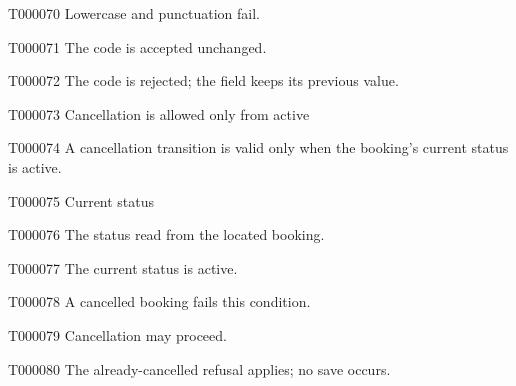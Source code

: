 \documentclass[11pt,a4paper]{article}
\begin{document}
\begin{atlasparagraph}{T000070}
Lowercase and punctuation fail.
\end{atlasparagraph}
\begin{atlasparagraph}{T000071}
The code is accepted unchanged.
\end{atlasparagraph}
\begin{atlasparagraph}{T000072}
The code is rejected; the field keeps its previous value.
\end{atlasparagraph}
\begin{atlastext}{T000073}
Cancellation is allowed only from active
\end{atlastext}
\begin{atlasparagraph}{T000074}
A cancellation transition is valid only when the booking's current status is active.
\end{atlasparagraph}
\begin{atlastext}{T000075}
Current status
\end{atlastext}
\begin{atlasparagraph}{T000076}
The status read from the located booking.
\end{atlasparagraph}
\begin{atlastext}{T000077}
The current status is active.
\end{atlastext}
\begin{atlasparagraph}{T000078}
A cancelled booking fails this condition.
\end{atlasparagraph}
\begin{atlasparagraph}{T000079}
Cancellation may proceed.
\end{atlasparagraph}
\begin{atlasparagraph}{T000080}
The already-cancelled refusal applies; no save occurs.
\end{atlasparagraph}
\end{document}
